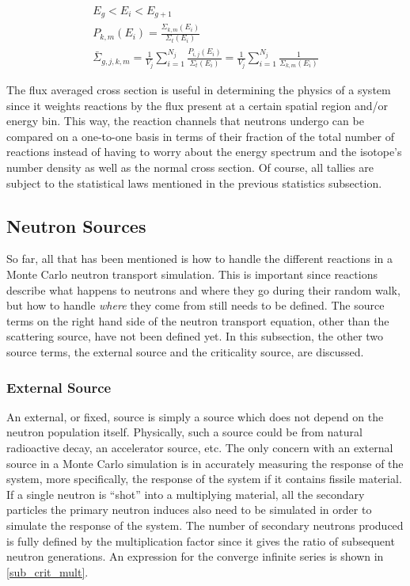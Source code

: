 \begin{equation}
\label{flux_average_xs_tally}
\begin{gathered}
E_g < E_i < E_{g+1} \\
P_{k,m}(E_i)= \frac{\Sigma_{k,m}(E_i)}{\Sigma_t(E_i)} \\
\bar{\Sigma}_{g,j,k,m} =  \frac{1}{V_j} \sum_{i=1}^{N_j} \frac{P_{i,j}(E_i)}{\Sigma_t(E_i)} = \frac{1}{V_j} \sum_{i=1}^{N_j} \frac{1}{\Sigma_{k,m}(E_i)}
\end{gathered}
\end{equation}

The flux averaged cross section is useful in determining the physics of a system since it weights reactions by the flux present at a certain spatial region and/or energy bin.  This way, the reaction channels that neutrons undergo can be compared on a one-to-one basis in terms of their fraction of the total number of reactions instead of having to worry about the energy spectrum and the isotope's number density as well as the normal cross section.  Of course, all tallies are subject to the statistical laws mentioned in the previous statistics subsection.


\subsection{Neutron Sources}

So far, all that has been mentioned is how to handle the different reactions in a Monte Carlo neutron transport simulation.  This is important since reactions describe what happens to neutrons and where they go during their random walk, but how to handle \emph{where} they come from still needs to be defined.  The source terms on the right hand side of the neutron transport equation, other than the scattering source, have not been defined yet.  In this subsection, the other two source terms, the external source and the criticality source, are discussed.

\subsubsection{External Source}

An external, or fixed, source is simply a source which does not depend on the neutron population itself.  Physically, such a source could be from natural radioactive decay, an accelerator source, etc.  The only concern with an external source in a Monte Carlo simulation is in accurately measuring the response of the system, more specifically, the response of the system if it contains fissile material.  If a single neutron is ``shot'' into a multiplying material, all the secondary particles the primary neutron induces also need to be simulated in order to simulate the response of the system.  The number of secondary neutrons produced is fully defined by the multiplication factor since it gives the ratio of subsequent neutron generations.  An expression for the converge infinite series is shown in \eqref{sub_crit_mult}\cite{duderstadt}\cite{jaakko}.

